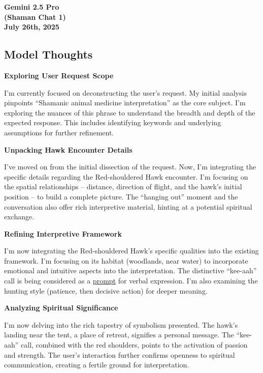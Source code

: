 \documentclass{article}
\begin{document}
\begin{center}
\textbf{Gemini 2.5 Pro}\\
\textbf{(Shaman Chat 1)}\\
\textbf{July 26th, 2025}
\end{center}

\subsection*{Model Thoughts}\label{model-thoughts}

\textbf{Exploring User Request Scope}

I'm currently focused on deconstructing the user's request. My initial analysis pinpoints ``Shamanic animal medicine interpretation'' as the core subject. I'm exploring the nuances of this phrase to understand the breadth and depth of the expected response. This includes identifying keywords and underlying assumptions for further refinement.

\textbf{Unpacking Hawk Encounter Details}

I've moved on from the initial dissection of the request. Now, I'm integrating the specific details regarding the Red-shouldered Hawk encounter. I'm focusing on the spatial relationships -- distance, direction of flight, and the hawk's initial position -- to build a complete picture. The ``hanging out'' moment and the conversation also offer rich interpretive material, hinting at a potential spiritual exchange.

\textbf{Refining Interpretive Framework}

I'm now integrating the Red-shouldered Hawk's specific qualities into the existing framework. I'm focusing on its habitat (woodlands, near water) to incorporate emotional and intuitive aspects into the interpretation. The distinctive ``kee-aah'' call is being considered as a \hyperlink{gloss:prompt}{prompt} for verbal expression. I'm also examining the hunting style (patience, then decisive action) for deeper meaning.

\textbf{Analyzing Spiritual Significance}

I'm now delving into the rich tapestry of symbolism presented. The hawk's landing near the tent, a place of retreat, signifies a personal message. The ``kee-aah'' call, combined with the red shoulders, points to the activation of passion and strength. The user's interaction further confirms openness to spiritual communication, creating a fertile ground for interpretation.
\end{document}
